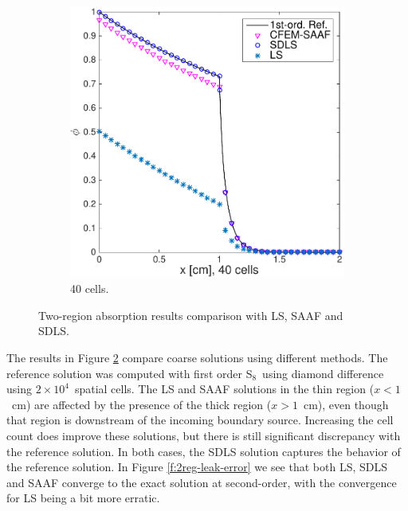 \documentclass[review]{elsarticle}
\begin{document}
\begin{figure}[ht!]
\begin{subfigure}{.5\textwidth}
		\includegraphics[width=1.\linewidth]{2reg-40c-cdls.pdf}
		\caption{40 cells.}
		\label{f:2reg-40c}
	\end{subfigure}
	\caption{Two-region absorption results comparison with LS, SAAF and SDLS.}
	\label{mlfls}
\end{figure}

The results in Figure \ref{mlfls} compare coarse solutions using different methods. The reference solution was computed with first order S$_8$\ using diamond difference using $2\times10^4$\ spatial cells. The LS and SAAF solutions in the thin region ($x<1$\ cm) are affected by the presence of the thick region ($x>1$\ cm), even though that region is downstream of the incoming boundary source.  Increasing the cell count does improve these solutions, but there is still significant discrepancy with the reference solution. In both cases, the SDLS solution captures the behavior of the reference solution. In Figure \ref{f:2reg-leak-error} we see that both LS, SDLS and SAAF converge to the exact solution at second-order, with the convergence for LS being a bit more erratic.
\end{document}
